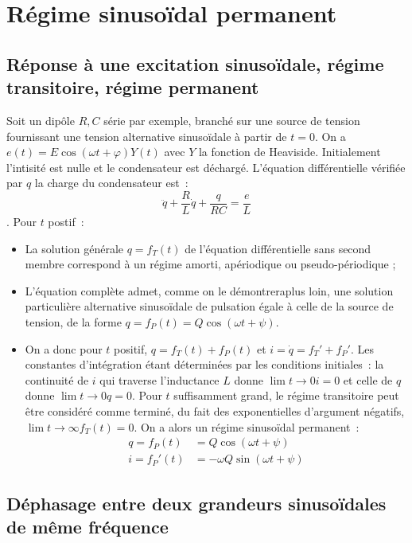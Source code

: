 \chapter{Régime sinusoïdal permanent}
\minitoc
\minilof
\minilot

\section{Réponse à une excitation sinusoïdale, régime transitoire, régime permanent}
    Soit un dipôle $R, C$ série par exemple, branché sur une source de tension fournissant une tension alternative sinusoïdale à partir de $t=0$. On a $e(t) = E\cos(\omega t + \varphi) Y(t)$ avec $Y$ la fonction de Heaviside. Initialement l'intisité est nulle et le condensateur est déchargé. L'équation différentielle vérifiée par $q$ la charge du condensateur est~: \[ \ddot{q} + \frac{R}{L} \dot{q} + \frac{q}{RC} = \frac{e}{L} \]. Pour $t$ postif~:
    \begin{itemize}
        \item La solution générale $q= f_T(t)$ de l'équation différentielle sans second membre correspond à un régime amorti, apériodique ou pseudo-périodique ;
        \item L'équation complète admet, comme on le démontreraplus loin, une solution particulière alternative sinusoïdale de pulsation égale à celle de la source de tension, de la forme $q = f_P(t) = Q \cos(\omega t +\psi)$.
        \item On a donc pour $t$ positif, $q = f_T(t) + f_P(t)$ et $i = \dot{q} = f_T' + f_P'$. Les constantes d'intégration étant déterminées par les conditions initiales~: la continuité de $i$ qui traverse l'inductance $L$ donne $\lim\limits{t \to 0} i = 0$ et celle de $q$ donne $\lim\limits{t \to 0} q = 0$. Pour $t$ suffisamment grand, le régime transitoire peut être considéré comme terminé, du fait des exponentielles d'argument négatifs, $\lim\limits{t \to \infty} f_T(t) = 0$. On a alors un régime sinusoïdal permanent~:
        \begin{align}
            q = f_P(t) &= Q \cos(\omega t +\psi) \\
            i = f_P'(t) &= -\omega Q\sin(\omega t +\psi)
        \end{align}
    \end{itemize}
\section{Déphasage entre deux grandeurs sinusoïdales de même fréquence}

